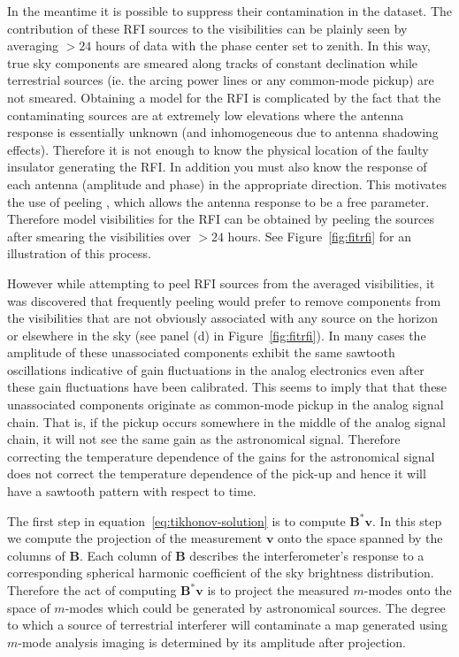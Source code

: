 \documentclass[twocolumn]{aastex6}
\renewcommand{\b}{\pmb}
\begin{document}
In the meantime it is possible to suppress their contamination in the dataset. The contribution of
these RFI sources to the visibilities can be plainly seen by averaging $>24$ hours of data with the
phase center set to zenith. In this way, true sky components are smeared along tracks of constant
declination while terrestrial sources (ie. the arcing power lines or any common-mode pickup) are not
smeared.  Obtaining a model for the RFI is complicated by the fact that the contaminating sources
are at extremely low elevations where the antenna response is essentially unknown (and inhomogeneous
due to antenna shadowing effects). Therefore it is not enough to know the physical location of the
faulty insulator generating the RFI. In addition you must also know the response of each antenna
(amplitude and phase) in the appropriate direction. This motivates the use of peeling
\citep{2008ISTSP...2..707M, 2015MNRAS.449.2668S}, which allows the antenna response to be a free
parameter.  Therefore model visibilities for the RFI can be obtained by peeling the sources after
smearing the visibilities over $>24$ hours. See Figure~\ref{fig:fitrfi} for an illustration of this
process.

However while attempting to peel RFI sources from the averaged visibilities, it was discovered that
frequently peeling would prefer to remove components from the visibilities that are not obviously
associated with any source on the horizon or elsewhere in the sky (see panel (d) in
Figure~\ref{fig:fitrfi}). In many cases the amplitude of these unassociated components exhibit the
same sawtooth oscillations indicative of gain fluctuations in the analog electronics even after
these gain fluctuations have been calibrated. This seems to imply that that these unassociated
components originate as common-mode pickup in the analog signal chain. That is, if the pickup occurs
somewhere in the middle of the analog signal chain, it will not see the same gain as the
astronomical signal. Therefore correcting the temperature dependence of the gains for the
astronomical signal does not correct the temperature dependence of the pick-up and hence it will
have a sawtooth pattern with respect to time.

The first step in equation~\ref{eq:tikhonov-solution} is to compute $\b B^*\b v$. In this step we
compute the projection of the measurement $\b v$ onto the space spanned by the columns of $\b B$.
Each column of $\b B$ describes the interferometer's response to a corresponding spherical harmonic
coefficient of the sky brightness distribution. Therefore the act of computing $\b B^*\b v$ is to
project the measured $m$-modes onto the space of $m$-modes which could be generated by astronomical
sources. The degree to which a source of terrestrial interferer will contaminate a map generated
using $m$-mode analysis imaging is determined by its amplitude after projection.
\end{document}
